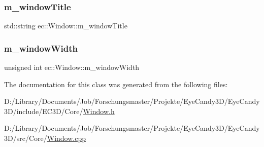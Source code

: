 \mbox{\label{classec_1_1_window_a2f9c3a96c57440be25c92fc09e8913d2}} 
\subsubsection{\texorpdfstring{m\+\_\+window\+Title}{m\_windowTitle}}
{\footnotesize\ttfamily std\+::string ec\+::\+Window\+::m\+\_\+window\+Title\hspace{0.3cm}{\ttfamily [protected]}}

\mbox{\label{classec_1_1_window_a123952ed65bb1099068dd7ca2781bd4b}} 
\subsubsection{\texorpdfstring{m\+\_\+window\+Width}{m\_windowWidth}}
{\footnotesize\ttfamily unsigned int ec\+::\+Window\+::m\+\_\+window\+Width\hspace{0.3cm}{\ttfamily [protected]}}



The documentation for this class was generated from the following files\+:\begin{DoxyCompactItemize}
\item 
D\+:/\+Library/\+Documents/\+Job/\+Forschungsmaster/\+Projekte/\+Eye\+Candy3\+D/\+Eye\+Candy3\+D/include/\+E\+C3\+D/\+Core/\mbox{\hyperlink{_core_2_window_8h}{Window.\+h}}\item 
D\+:/\+Library/\+Documents/\+Job/\+Forschungsmaster/\+Projekte/\+Eye\+Candy3\+D/\+Eye\+Candy3\+D/src/\+Core/\mbox{\hyperlink{_core_2_window_8cpp}{Window.\+cpp}}\end{DoxyCompactItemize}
